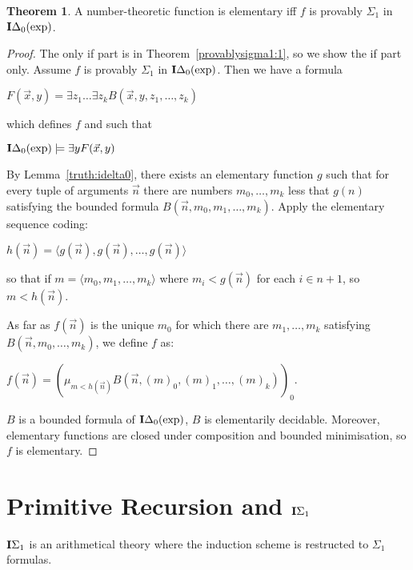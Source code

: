 \documentclass[8pt]{article}
\theoremstyle{definition}
\theoremstyle{definition}
\newtheorem{theorem}{Theorem}[section]
\theoremstyle{definition}
\theoremstyle{definition}
\theoremstyle{definition}
\theoremstyle{definition}
\theoremstyle{definition}
\theoremstyle{definition}
\theoremstyle{definition}
\theoremstyle{definition}
\theoremstyle{definition}
\theoremstyle{definition}
\theoremstyle{definition}
\theoremstyle{question}
\begin{document}
\begin{theorem}
  A number-theoretic function is elementary iff $f$ is provably $\Sigma_1$ in ${\bf I}\Delta_0(\operatorname{exp})$.
\end{theorem}

\begin{proof}
  The only if part is in Theorem~\ref{provablysigma1:1}, so we show the if part only.
  Assume $f$ is provably $\Sigma_1$ in ${\bf I}\Delta_0(\operatorname{exp})$. Then we have a formula
  \begin{center}
    $F(\vec{x}, y) = \exists z_1 \dots \exists z_k B(\vec{x}, y, z_1, \dots, z_k)$
  \end{center}
  which defines $f$ and such that
  \begin{center}
  ${\bf I}\Delta_0(\operatorname{exp}) \models \exists y F(\vec{x}, y)$
  \end{center}
  By Lemma~\ref{truth:idelta0}, there exists an elementary function $g$ such that for every
  tuple of arguments $\vec{n}$ there are numbers $m_0, \dots, m_k$
  less that $g(n)$ satisfying the bounded formula $B(\vec{n}, m_0, m_1, \dots, m_k)$.
  Apply the elementary sequence coding:
  \begin{center}
    $h(\vec{n}) = \langle g(\vec{n}), g(\vec{n}), \dots, g(\vec{n})\rangle$
  \end{center}
  so that if $m = \langle m_0, m_1, \dots, m_k \rangle$
  where $m_i < g(\vec{n})$ for each $i \in n + 1$, so $m < h(\vec{n})$.

  As far as $f(\vec{n})$ is the unique $m_0$ for which there are $m_1, \dots, m_k$ satisfying
  $B(\vec{n}, m_0, \dots, m_k)$, we define $f$ as:
  \begin{center}
    $f(\vec{n}) = (\mu_{m < h(\vec{n})} B(\vec{n}, (m)_0, (m)_1, \dots, (m)_k))_0$.
  \end{center}

  $B$ is a bounded formula of ${\bf I}\Delta_0(\operatorname{exp})$, $B$ is elementarily 
  decidable. Moreover, elementary functions are closed under composition and bounded minimisation,
  so $f$ is elementary.
\end{proof}

\section{Primitive Recursion and ${\bf I}\Sigma_1$}

${\bf I}\Sigma_1$ is an arithmetical theory where the induction scheme is
restructed to $\Sigma_1$ formulas.
\end{document}
